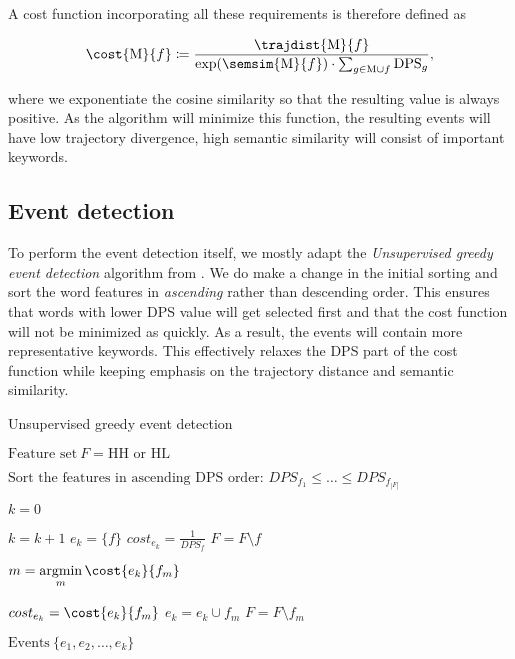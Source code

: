 A cost function incorporating all these requirements is therefore defined as

\begin{equation} \label{eq:cost-function}
	\cost{\featset}{f} \coloneqq \frac{\trajdist{\featset}{f}}{\exp(\semsim{\featset}{f}) \cdot \sum_{g \in \featset \cup f}{\text{DPS}_{g}}},
\end{equation}

where we exponentiate the cosine similarity so that the resulting value is always positive. As the algorithm will minimize this function, the resulting events will have low trajectory divergence, high semantic similarity will consist of important keywords.


\subsection{Event detection}
To perform the event detection itself, we mostly adapt the \textit{Unsupervised greedy event detection} algorithm from \cite{event-detection}. We do make a change in the initial sorting and sort the word features in \textit{ascending} rather than descending order. This ensures that words with lower DPS value will get selected first and that the cost function will not be minimized as quickly. As a result, the events will contain more representative keywords. This effectively relaxes the DPS part of the cost function while keeping emphasis on the trajectory distance and semantic similarity.

\begin{algorithm}[H]
\begin{algorithmic}[1]
\caption{Unsupervised greedy event detection}
\Input $\text{Feature set} ~ F = \text{HH or HL}$

\State $\text{Sort the features in ascending DPS order: } DPS_{f_{1}} \leq \dots \leq DPS_{f_{\left\vert F \right\vert}}$

\State $k = 0$

	\State $k = k + 1$	
	\State $e_{k} = \{ f \}$
	\State $cost_{e_{k}} = \frac{1}{DPS_{f}}$
	\State $F = F \setminus f$
	
		\State $m = \argmin\limits_{m}{\cost{e_{k}}{f_{m}}}$

			\State $cost_{e_{k}} = \cost{e_{k}}{f_{m}}$
			\State $e_{k} = e_{k} \cup f_{m}$
			\State $F = F \setminus f_{m}$
		\Else
			\Break
		\EndIf
	\EndWhile
\EndFor

\Output $\text{Events} ~ \{ e_{1}, e_{2}, \dots, e_{k} \}$
\end{algorithmic}
\end{algorithm}


